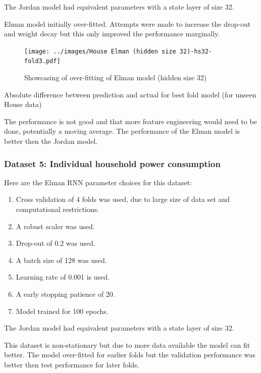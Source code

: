 \documentclass[conference]{IEEEtran}
\begin{document}
The Jordan model had equivalent parameters with a state layer of size 32.

Elman model initially over-fitted. Attempts were made to increase the drop-out and weight decay but this only improved the performance marginally.

\begin{figure}[H] 
	\centering
	\texttt{[image: ../images/House Elman (hidden size 32)-hs32-fold3.pdf]}
	\caption{Showcasing of over-fitting of Elman model (hidden size 32)}
	\label{fig:overfit-elman-prop}
\end{figure}

\begin{table}[H]
	\caption{Absolute difference between prediction and actual for best fold model (for unseen House data)}
	\label{tab:house-rnn-summary}
\end{table}

The performance is not good and that more feature engineering would need to be done, potentially a moving average. The performance of the Elman model is better then the Jordan model.

\subsubsection{Dataset 5: Individual household power consumption}

Here are the Elman RNN parameter choices for this dataset:

\begin{enumerate}[]
	\item Cross validation of 4 folds was used, due to large size of data set and computational restrictions.
	\item A robust scaler was used.
	\item Drop-out of 0.2 was used.
	\item A batch size of 128 was used.
	\item Learning rate of 0.001 is used.
	\item A early stopping patience of 20.
	\item Model trained for 100 epochs.
\end{enumerate}

The Jordan model had equivalent parameters with a state layer of size 32.

This dataset is non-stationary but due to more data available the model can fit better. The model over-fitted for earlier folds but the validation performance was better then test performance for later folds.
\end{document}
